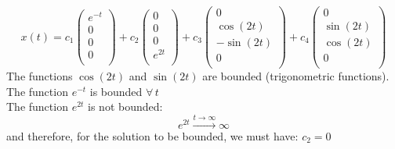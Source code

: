 \documentclass{article}
\begin{document}
$$x(t) = c_1
\begin{pmatrix}
    e^{-t} \\
    0 \\
    0 \\
    0 \\
\end{pmatrix}
+c_2
\begin{pmatrix}
    0 \\
    0 \\
    0 \\
    e^{2t} \\
\end{pmatrix}
+c_3
\begin{pmatrix}
    0 \\
    \cos(2t) \\
    -\sin(2t) \\
    0 \\
\end{pmatrix}
+c_4 
\begin{pmatrix}
    0 \\
    \sin(2t) \\
    \cos(2t) \\
    0 \\
\end{pmatrix}$$
The functions $\cos(2t)$ and $\sin(2t)$ are bounded (trigonometric functions). \\
The function $e^{-t}$ is bounded $\forall \, t$ \\
The function $e^{2t}$ is not bounded: \\
$$e^{2t} \xrightarrow{t\xrightarrow{}\infty} \infty$$
and therefore, for the solution to be bounded, we must have: $c_2 = 0$
\end{document}
